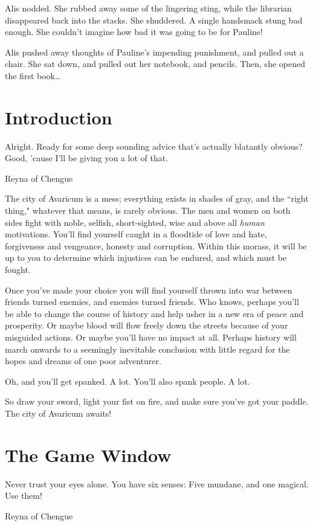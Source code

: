 \documentclass{report}
\begin{document}
Alis nodded. She rubbed away some of the lingering sting, while the librarian disappeared back into the stacks. She shuddered. A single handsmack
stung bad enough. She couldn't imagine how bad it was going to be for Pauline!

Alis pushed away thoughts of Pauline's impending punishment, and pulled out a chair. She sat down, and pulled out her notebook, and pencils. Then,  she opened the 
first book\ldots

\maketitle
\tableofcontents

\chapter{Introduction}
\label{ch_introduction}
\epigraph{Alright. Ready for some deep sounding advice that's actually
blatantly obvious? Good, 'cause I'll be giving you a lot of that.}{Reyna of Chengue}


The city of Avaricum is 
a mess; everything exists in shades of gray, and the ``right thing," whatever that means, is rarely obvious. The men and women on both sides fight with noble, 
selfish, short-sighted, 
wise and above all \emph{human} 
motivations. You'll find yourself caught in a floodtide of love and hate, forgiveness and vengeance, honesty and corruption. Within this morass, it will be up to you to 
determine which injustices can be endured, and which must be fought. 

Once you've made your choice you will find yourself thrown into war between friends turned
enemies, and enemies turned friends. Who knows, perhaps you'll be able to change the course of history and help usher in a new era of peace and prosperity. Or maybe blood 
will flow freely down the streets because of your misguided actions. Or maybe you'll have no impact at all. Perhaps history
will march onwards to a seemingly inevitable conclusion with little regard for the hopes and dreams of one poor adventurer.

Oh, and you'll get spanked. A lot. You'll also spank people. A lot.

So draw your sword, light your fist on fire, and make sure you've got your paddle. The city of Avaricum awaits!

\chapter{The Game Window}
\label{ch_game_window}
\epigraph{Never trust your eyes alone. You have six senses: Five mundane, and one magical. Use them!}{Reyna of Chengue}
\end{document}
